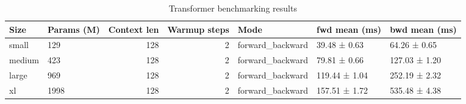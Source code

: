 \begin{table}
\caption{Transformer benchmarking results}
\label{tab:benchmarks}
\begin{tabular}{llrrlll}
\toprule
Size & Params (M) & Context len & Warmup steps & Mode & fwd mean (ms) & bwd mean (ms) \\
\midrule
small & 129 & 128 & 2 & forward_backward & 39.48 ± 0.63 & 64.26 ± 0.65 \\
medium & 423 & 128 & 2 & forward_backward & 79.81 ± 0.66 & 127.03 ± 1.20 \\
large & 969 & 128 & 2 & forward_backward & 119.44 ± 1.04 & 252.19 ± 2.32 \\
xl & 1998 & 128 & 2 & forward_backward & 157.51 ± 1.72 & 535.48 ± 4.38 \\
\bottomrule
\end{tabular}
\end{table}
